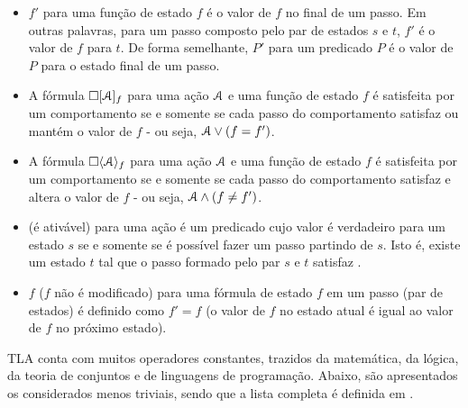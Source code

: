 \begin{itemize}
  \item $f'$ para uma função de estado $f$ é o valor de $f$ no final de um passo. Em outras palavras, para um passo composto pelo par de estados $s$ e $t$, $f'$ é o valor de $f$ para $t$. De forma semelhante, $P'$ para um predicado $P$ é o valor de $P$ para o estado final de um passo.

  \item A fórmula $\square [\textbf{$\mathcal{A}$}]_f$ para uma ação $\textbf{$\mathcal{A}$}$ e uma função de estado $f$ é satisfeita por um comportamento se e somente se cada passo do comportamento satisfaz \FANCYA ou mantém o valor de $f$ - ou seja, $\textbf{$\mathcal{A}$} \lor (f = f')$.

  \item A fórmula $\square \langle\textbf{$\mathcal{A}$}\rangle_f$ para uma ação $\textbf{$\mathcal{A}$}$ e uma função de estado $f$ é satisfeita por um comportamento se e somente se cada passo do comportamento satisfaz \FANCYA e altera o valor de $f$ - ou seja, $\textbf{$\mathcal{A}$} \land (f \neq f')$.

  \item \ENABLED \FANCYA (\FANCYA é ativável) para uma ação \FANCYA é um predicado cujo valor é verdadeiro para um estado $s$ se e somente se é possível fazer um passo \FANCYA partindo de $s$. Isto é, existe um estado $t$ tal que o passo formado pelo par $s$ e $t$ satisfaz \FANCYA.

  \item \UNCHANGED $f$ ($f$ não é modificado) para uma fórmula de estado $f$ em um passo (par de estados) é definido como $f' = f$  (o valor de $f$ no estado atual é igual ao valor de $f$ no próximo estado).

\end{itemize}

TLA conta com muitos operadores constantes, trazidos da matemática, da lógica, da teoria de conjuntos e de linguagens de programação. Abaixo, são apresentados os considerados menos triviais, sendo que a lista completa é definida em \cite{specifying-systems}.

